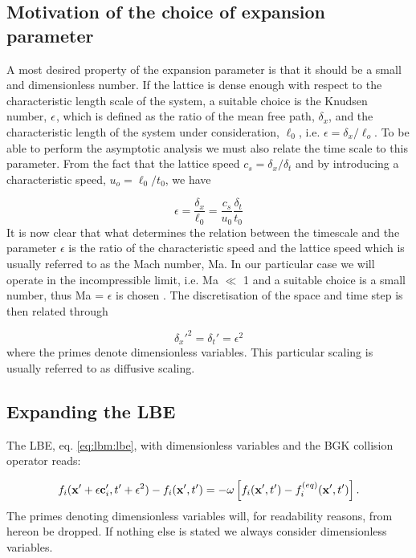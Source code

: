 \subsection{Motivation of the choice of expansion parameter}
A most desired property of the expansion parameter is that it should
be a small and dimensionless number. If the lattice is dense enough with
respect to the characteristic length scale of the system, a suitable
choice is the Knudsen number, $\epsilon$, which is defined as the ratio of
the mean free path, $\delta_x$, and the characteristic length of the
system under consideration, $\ell_0$, i.e. $\epsilon = \delta_x
/\ell_o$. To be able to perform the asymptotic analysis we must also
relate the time scale to this parameter. From the fact that the
lattice speed $c_s = \delta_x/\delta_t$ and by introducing a
characteristic speed, $u_o = \ell_0/t_0$, we have

\begin{equation}\label{eq:lbm:rel}
\epsilon = \frac{\delta_x}{\ell_0} = \frac{c_s}{u_0}\frac{\delta_t}{t_0}
\end{equation}
It is now clear that what determines the relation between the
timescale and the parameter $\epsilon$ is the ratio of the
characteristic speed and the lattice speed which is usually referred
to as the Mach number, Ma. In our particular case we will operate in
the incompressible limit, i.e. Ma $\ll$ 1 and a suitable choice is a
small number, thus Ma = $\epsilon$ is chosen \cite{junk-boundary}. The
discretisation of the space and time step is then related through

\begin{equation}
\delta_x'^2 = \delta_t' = \epsilon^2
\end{equation}
where the primes denote dimensionless variables. This particular
scaling is usually referred to as diffusive scaling.

\subsection{Expanding the LBE}
The LBE, eq. \eqref{eq:lbm:lbe}, with dimensionless variables and the
BGK collision operator reads:

\begin{equation}\label{eq:lbm:nodim_lbe}
f_i(\mathbf{x}' + \epsilon \mathbf{c}_i', t' + \epsilon^2) - f_i(\mathbf{x}', t') = -\omega \left[
  f_i(\mathbf{x}', t') - f_i^{(eq)}(\mathbf{x}', t') \right].
\end{equation} 
The primes denoting dimensionless variables will, for readability
reasons, from hereon be dropped. If nothing else is stated we always
consider dimensionless variables.

